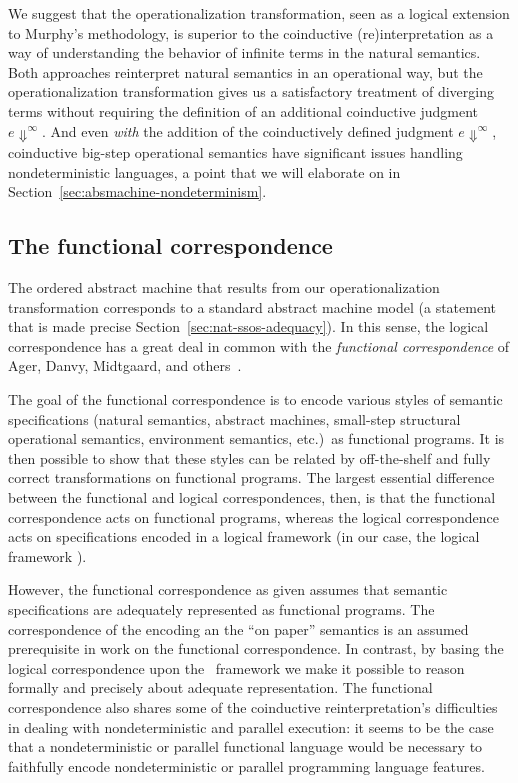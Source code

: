 We suggest that the operationalization transformation, seen as a
logical extension to Murphy's methodology, is superior to the
coinductive (re)interpretation as a way of understanding the behavior
of infinite terms in the natural semantics. Both approaches
reinterpret natural semantics in an operational way, but the
operationalization transformation gives us a satisfactory treatment of
diverging terms without requiring the definition of an additional
coinductive judgment $e \Downarrow^\infty$. And even {\it with} the
addition of the coinductively defined judgment $e \Downarrow^\infty$,
coinductive big-step operational semantics have significant issues
handling nondeterministic languages, a point that we will elaborate on
in Section~\ref{sec:absmachine-nondeterminism}.

\subsection*{The functional correspondence}

The ordered abstract machine that results from our operationalization
transformation corresponds to a standard abstract machine model (a
statement that is made precise
Section~\ref{sec:nat-ssos-adequacy}). In this sense, the logical
correspondence has a great deal in common with the {\it functional
  correspondence} of Ager, Danvy, Midtgaard, and
others~\cite{ager03functional,ager04functional,ager05functional,
  danvy08defunctionalized,danvy12interderiving}. 

The goal of the functional correspondence is to encode various styles
of semantic specifications (natural semantics, abstract machines,
small-step structural operational semantics, environment semantics,
etc.)~as functional programs. It is then possible to show that these
styles can be related by off-the-shelf and fully correct
transformations on functional programs. The largest essential
difference between the functional and logical correspondences, then,
is that the functional correspondence acts on functional programs,
whereas the logical correspondence acts on specifications encoded in a
logical framework (in our case, the logical framework \sls).

However, the functional correspondence as given assumes that semantic
specifications are adequately represented as functional programs. The
correspondence of the encoding an the ``on paper'' semantics is an
assumed prerequisite in work on the functional correspondence. In
contrast, by basing the logical correspondence upon the \sls~framework
we make it possible to reason formally and precisely about adequate
representation. The functional correspondence also shares some of the
coinductive reinterpretation's difficulties in dealing with
nondeterministic and parallel execution: it seems to be the case that
a nondeterministic or parallel functional language would be necessary
to faithfully encode nondeterministic or parallel programming language
features.

